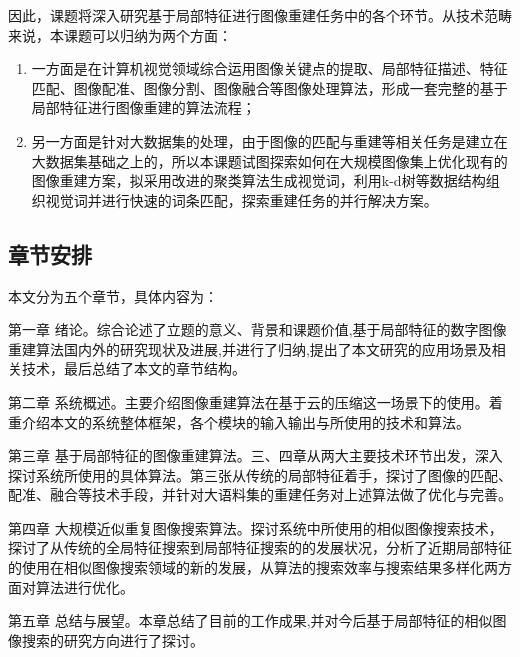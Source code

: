 因此，课题将深入研究基于局部特征进行图像重建任务中的各个环节。从技术范畴来说，本课题可以归纳为两个方面：

\begin{enumerate}
\item 一方面是在计算机视觉领域综合运用图像关键点的提取、局部特征描述、特征匹配、图像配准、图像分割、图像融合等图像处理算法，形成一套完整的基于局部特征进行图像重建的算法流程；
\item 另一方面是针对大数据集的处理，由于图像的匹配与重建等相关任务是建立在大数据集基础之上的，所以本课题试图探索如何在大规模图像集上优化现有的图像重建方案，拟采用改进的聚类算法生成视觉词，利用k-d树等数据结构组织视觉词并进行快速的词条匹配，探索重建任务的并行解决方案。
\end{enumerate}


\subsection{章节安排}
本文分为五个章节，具体内容为：

第一章 绪论。综合论述了立题的意义、背景和课题价值,基于局部特征的数字图像重建算法国内外的研究现状及进展,并进行了归纳,提出了本文研究的应用场景及相关技术，最后总结了本文的章节结构。

第二章 系统概述。主要介绍图像重建算法在基于云的压缩这一场景下的使用。着重介绍本文的系统整体框架，各个模块的输入输出与所使用的技术和算法。

第三章 基于局部特征的图像重建算法。三、四章从两大主要技术环节出发，深入探讨系统所使用的具体算法。第三张从传统的局部特征着手，探讨了图像的匹配、配准、融合等技术手段，并针对大语料集的重建任务对上述算法做了优化与完善。

第四章 大规模近似重复图像搜索算法。探讨系统中所使用的相似图像搜索技术，探讨了从传统的全局特征搜索到局部特征搜索的的发展状况，分析了近期局部特征的使用在相似图像搜索领域的新的发展，从算法的搜索效率与搜索结果多样化两方面对算法进行优化。

第五章 总结与展望。本章总结了目前的工作成果,并对今后基于局部特征的相似图像搜索的研究方向进行了探讨。

\ifx\usechapbib\empty
\nocite{BSTcontrol}


\fi
